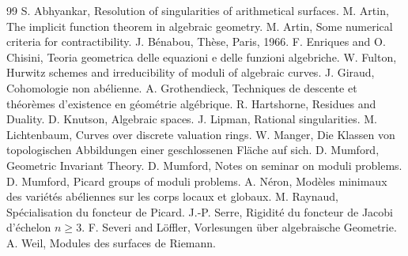 \documentclass[11pt]{article}
\theoremstyle{plain}
\theoremstyle{definition}
\theoremstyle{remark}
\begin{document}
\begin{thebibliography}{99}
 S. Abhyankar, Resolution of singularities of arithmetical surfaces.
 M. Artin, The implicit function theorem in algebraic geometry.
 M. Artin, Some numerical criteria for contractibility.
 J. Bénabou, Thèse, Paris, 1966.
 F. Enriques and O. Chisini, Teoria geometrica delle equazioni e delle funzioni algebriche.
 W. Fulton, Hurwitz schemes and irreducibility of moduli of algebraic curves.
 J. Giraud, Cohomologie non abélienne.
 A. Grothendieck, Techniques de descente et théorèmes d'existence en géométrie algébrique.
 R. Hartshorne, Residues and Duality.
 D. Knutson, Algebraic spaces.
 J. Lipman, Rational singularities.
 M. Lichtenbaum, Curves over discrete valuation rings.
 W. Manger, Die Klassen von topologischen Abbildungen einer geschlossenen Fläche auf sich.
 D. Mumford, Geometric Invariant Theory.
 D. Mumford, Notes on seminar on moduli problems.
 D. Mumford, Picard groups of moduli problems.
 A. Néron, Modèles minimaux des variétés abéliennes sur les corps locaux et globaux.
 M. Raynaud, Spécialisation du foncteur de Picard.
 J.-P. Serre, Rigidité du foncteur de Jacobi d'échelon \(n\geq 3\).
 F. Severi and Löffler, Vorlesungen über algebraische Geometrie.
 A. Weil, Modules des surfaces de Riemann.
\end{thebibliography}
\end{document}
